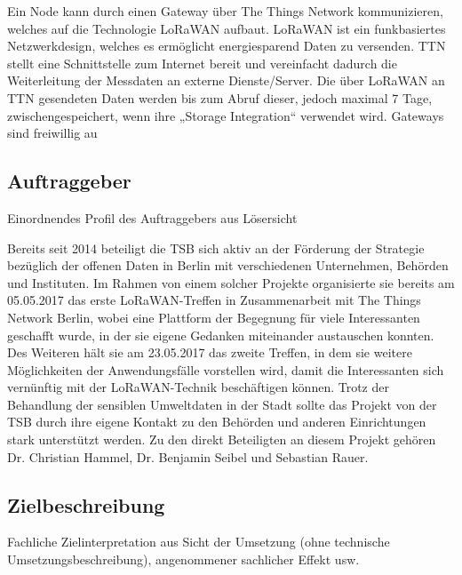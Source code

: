 \documentclass[
11pt,
a4paper,
ngerman,
]{article}
\newcommand{\descriptionWhat}[1]{%
	\begin{itshape}%
	#1 \\%
	\end{itshape}%
}
\begin{document}
Ein Node kann durch einen Gateway über The Things Network kommunizieren, welches auf die Technologie LoRaWAN aufbaut. LoRaWAN ist ein funkbasiertes Netzwerkdesign, welches es ermöglicht energiesparend Daten zu versenden. TTN stellt eine Schnittstelle zum Internet bereit und vereinfacht dadurch die Weiterleitung der Messdaten an externe Dienste/Server. Die über LoRaWAN an TTN gesendeten Daten werden bis zum Abruf dieser, jedoch maximal 7 Tage, zwischengespeichert, wenn ihre „Storage Integration“ verwendet wird.
Gateways sind freiwillig au

\subsection{Auftraggeber}

\descriptionWhat{Einordnendes Profil des Auftraggebers aus \glqq Lösersicht\grqq{}}

Bereits seit 2014 beteiligt die TSB sich aktiv an der Förderung der Strategie bezüglich der offenen Daten in Berlin mit verschiedenen Unternehmen, Behörden und Instituten.
Im Rahmen von einem solcher Projekte organisierte sie bereits am 05.05.2017 das erste \glqq LoRaWAN-Treffen\grqq{}  in Zusammenarbeit mit The Things Network Berlin, wobei eine Plattform der Begegnung für viele Interessanten geschafft wurde, in der sie eigene Gedanken miteinander austauschen konnten.
Des Weiteren hält sie am 23.05.2017 das zweite Treffen, in dem sie weitere Möglichkeiten der Anwendungsfälle vorstellen wird, damit die Interessanten sich vernünftig mit der LoRaWAN-Technik beschäftigen können.
Trotz der Behandlung der sensiblen Umweltdaten in der Stadt sollte das Projekt von der TSB durch ihre eigene Kontakt zu den Behörden und anderen Einrichtungen stark unterstützt werden.
Zu den direkt Beteiligten an diesem Projekt gehören Dr. Christian Hammel, Dr. Benjamin Seibel und Sebastian Rauer.

\subsection{Zielbeschreibung}

\descriptionWhat{Fachliche Zielinterpretation aus Sicht der Umsetzung (ohne technische Umsetzungsbeschreibung), angenommener sachlicher Effekt usw.}
\end{document}
